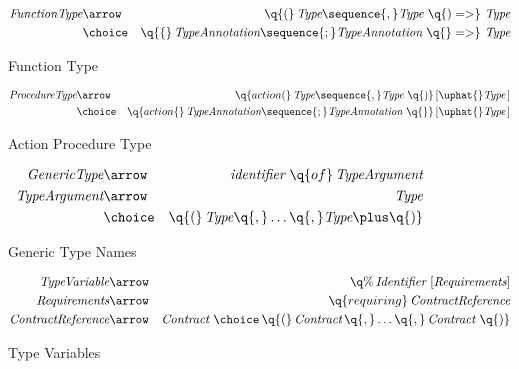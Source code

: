 \begin{figure}[htbp]
\begin{eqnarray*}
\emph{FunctionType}&\arrow&\q{(}\,\emph{Type}\sequence{,}\emph{Type}\ \q{) =>}\ \emph{Type}\\
&\choice&\q{\{}\,\emph{TypeAnnotation}\sequence{;}\emph{TypeAnnotation}\ \q{\}=>}\ \emph{Type}
\end{eqnarray*}
\caption{Function Type}
\label{functionTypeFig}
\end{figure}

\begin{figure}[htbp]
\begin{eqnarray*}
\emph{ProcedureType}&\arrow&\q{action(}\,\emph{Type}\sequence{,}\emph{Type}\ \q{)}\,[\uphat{}\emph{Type}\,]\\
&\choice&\q{action\{}\,\emph{TypeAnnotation}\sequence{;}\emph{TypeAnnotation}\ \q{\}}\,[\uphat{}\emph{Type}\,]
\end{eqnarray*}
\caption{Action Procedure Type}
\label{procedureTypeFig}
\end{figure}

\begin{figure}[htbp]
\begin{eqnarray*}
\emph{GenericType}&\arrow&\emph{identifier}\ \q{of}\,\emph{TypeArgument}\\
\emph{TypeArgument}&\arrow&\emph{Type}\\
&\choice&\q{(}\,\emph{Type}\q{,}\ldots\q{,}\emph{Type}\plus\q{)}
\end{eqnarray*}
\caption{Generic Type Names}
\label{genericTypeFig}
\end{figure}

\begin{figure}[htbp]
\begin{eqnarray*}
\emph{TypeVariable}&\arrow&\q{\%}\,\emph{Identifier}\ [\emph{Requirements}]\\
\emph{Requirements}&\arrow&\q{requiring}\, \emph{ContractReference}\\
\emph{ContractReference}&\arrow&\emph{Contract}\ \choice\,\q{(}\,\emph{Contract}\,\q{,}\ldots\q{,}\,\emph{Contract}\ \q{)}
\end{eqnarray*}
\caption{Type Variables}
\label{typeVariableFig}
\end{figure}


